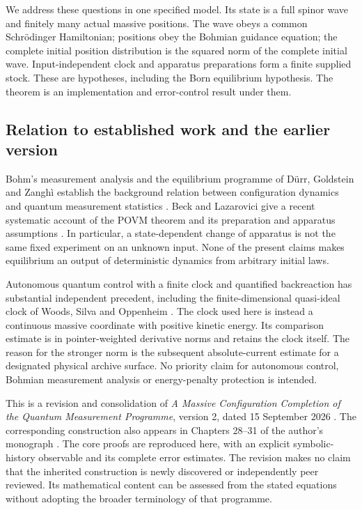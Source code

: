 \documentclass[11pt]{article}
\theoremstyle{definition}\newtheorem{assumption}[theorem]{Constitutive assumption}
\theoremstyle{remark}\newtheorem{remark}[theorem]{Remark}
\begin{document}
We address these questions in one specified model. Its state is a full spinor wave and finitely many actual massive positions. The wave obeys a common Schr\"odinger Hamiltonian; positions obey the Bohmian guidance equation; the complete initial position distribution is the squared norm of the complete initial wave. Input-independent clock and apparatus preparations form a finite supplied stock. These are hypotheses, including the Born equilibrium hypothesis. The theorem is an implementation and error-control result under them.

\subsection{Relation to established work and the earlier version}
Bohm's measurement analysis and the equilibrium programme of D\"urr, Goldstein and Zangh\`i establish the background relation between configuration dynamics and quantum measurement statistics \cite{BohmI,BohmII,DGZeq,DGZoperators}. Beck and Lazarovici give a recent systematic account of the POVM theorem and its preparation and apparatus assumptions \cite{BeckLazarovici}. In particular, a state-dependent change of apparatus is not the same fixed experiment on an unknown input. None of the present claims makes equilibrium an output of deterministic dynamics from arbitrary initial laws.

Autonomous quantum control with a finite clock and quantified backreaction has substantial independent precedent, including the finite-dimensional quasi-ideal clock of Woods, Silva and Oppenheim \cite{WoodsClock}. The clock used here is instead a continuous massive coordinate with positive kinetic energy. Its comparison estimate is in pointer-weighted derivative norms and retains the clock itself. The reason for the stronger norm is the subsequent absolute-current estimate for a designated physical archive surface. No priority claim for autonomous control, Bohmian measurement analysis or energy-penalty protection is intended.

This is a revision and consolidation of \emph{A Massive Configuration Completion of the Quantum Measurement Programme}, version 2, dated 15 September 2026 \cite{PriorMassive}. The corresponding construction also appears in Chapters 28--31 of the author's monograph \cite{Monograph}. The core proofs are reproduced here, with an explicit symbolic-history observable and its complete error estimates. The revision makes no claim that the inherited construction is newly discovered or independently peer reviewed. Its mathematical content can be assessed from the stated equations without adopting the broader terminology of that programme.
\end{document}
